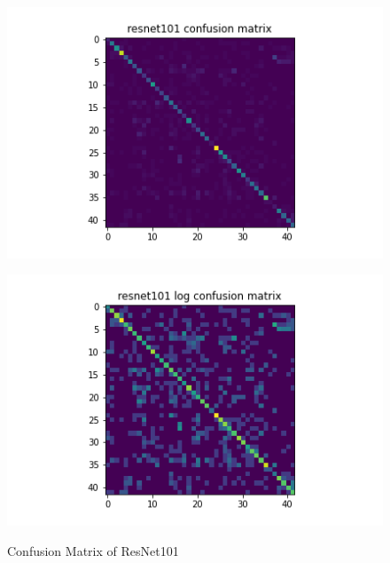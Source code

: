 \begin{figure}[H]
\begin{minipage}[b]{.5\linewidth}
    {\includegraphics[width=1.2\textwidth]{figs/conf_matrix/resnet101_conf.png}}
  \end{minipage}
  \hfill
  \begin{minipage}[b]{.5\linewidth}
    \centering

    {\includegraphics[width=1.2\textwidth]{figs/conf_matrix/resnet101_log_conf.png}}

  \end{minipage}

  \caption{Confusion Matrix of ResNet101}
  \label{fig:resnet101_conf}
  \vspace{0.2in}
\end{figure}

